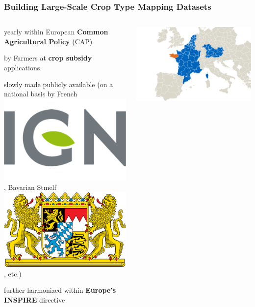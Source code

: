 \begin{frame}
\frametitle{Building Large-Scale Crop Type Mapping Datasets}

\begin{columns}


\Large

\begin{description}\setlength\itemsep{1em}
	\item[\color{tumblue}collected] yearly within European \textbf{Common Agricultural Policy} (CAP)
	\item[\color{tumblue}declared] by Farmers at \textbf{crop subsidy} applications
	\item[\color{tumblue}today] slowly made publicly available (on a national basis by French \includegraphics[height=.9em]{images/IGN-logo}, Bavarian Stmelf \includegraphics[height=.9em]{images/stmelf-logo}, etc.)
	\item[\color{tumblue}in future] further harmonized within \textbf{Europe's INSPIRE} directive
\end{description}

\includegraphics[width=\textwidth]{images/europe_data2}




\end{columns}

\vspace{2em}

\end{frame}


